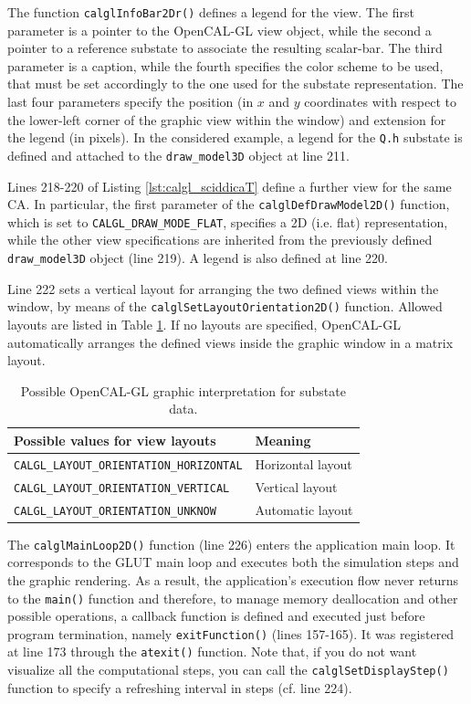 The function \verb'calglInfoBar2Dr()' defines a legend for the
view. The first parameter is a pointer to the OpenCAL-GL view object,
while the second a pointer to a reference substate to associate the
resulting scalar-bar. The third parameter is a caption, while the
fourth specifies the color scheme to be used, that must be set
accordingly to the one used for the substate representation. The last
four parameters specify the position (in $x$ and $y$ coordinates with
respect to the lower-left corner of the graphic view within the
window) and extension for the legend (in pixels). In the considered
example, a legend for the \verb'Q.h' substate is defined and attached
to the \verb'draw_model3D' object at line 211.

Lines 218-220 of Listing \ref{lst:calgl_sciddicaT} define a further
view for the same CA. In particular, the first parameter of the
\verb'calglDefDrawModel2D()' function, which is set to
\verb'CALGL_DRAW_MODE_FLAT', specifies a 2D (i.e. flat)
representation, while the other view specifications are inherited from
the previously defined \verb'draw_model3D' object (line 219). A legend
is also defined at line 220.

Line 222 sets a vertical layout for arranging the two defined views
within the window, by means of the
\verb'calglSetLayoutOrientation2D()' function. Allowed layouts are
listed in Table \ref{tab:calgl_layouts}. If no layouts are specified,
OpenCAL-GL automatically arranges the defined views inside the graphic
window in a matrix layout.

\begin{table}
  \centering
  \small
  \begin{tabular}{l|l}
    \hline
    Possible values for view layouts & Meaning\\
    \hline
    \hline
    \verb'CALGL_LAYOUT_ORIENTATION_HORIZONTAL' & Horizontal layout\\
    \verb'CALGL_LAYOUT_ORIENTATION_VERTICAL'   & Vertical layout\\
    \verb'CALGL_LAYOUT_ORIENTATION_UNKNOW'     & Automatic layout\\
    \hline
  \end{tabular}
  \caption{Possible OpenCAL-GL graphic interpretation for substate data.}
  \label{tab:calgl_layouts}
\end{table}

The \verb'calglMainLoop2D()' function (line 226) enters the
application main loop. It corresponds to the GLUT main loop and
executes both the simulation steps and the graphic rendering. As a
result, the application's execution flow never returns to the
\verb'main()' function and therefore, to manage memory deallocation
and other possible operations, a callback function is defined and
executed just before program termination, namely \verb'exitFunction()'
(lines 157-165). It was registered at line 173 through the
\verb'atexit()' function. Note that, if you do not want visualize all
the computational steps, you can call the \verb'calglSetDisplayStep()'
function to specify a refreshing interval in steps (cf. line 224).

